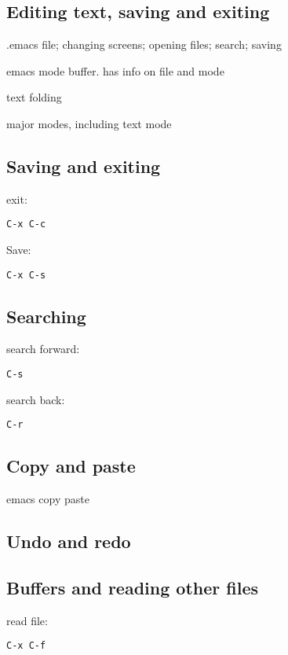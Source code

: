 
\subsection{Editing text, saving and exiting}
 
.emacs file; changing screens; opening files; search; saving

emacs mode buffer. has info on file and mode

text folding

major modes, including text mode

\subsection{Saving and exiting}

exit:
\begin{verbatim}
C-x C-c
\end{verbatim}
Save:
\begin{verbatim}
C-x C-s
\end{verbatim}





\subsection{Searching}

search forward:
\begin{verbatim}
C-s
\end{verbatim}

search back:
\begin{verbatim}
C-r
\end{verbatim}


\subsection{Copy and paste}

emacs copy paste


\subsection{Undo and redo}

\subsection{Buffers and reading other files}

read file:
\begin{verbatim}
C-x C-f
\end{verbatim}


